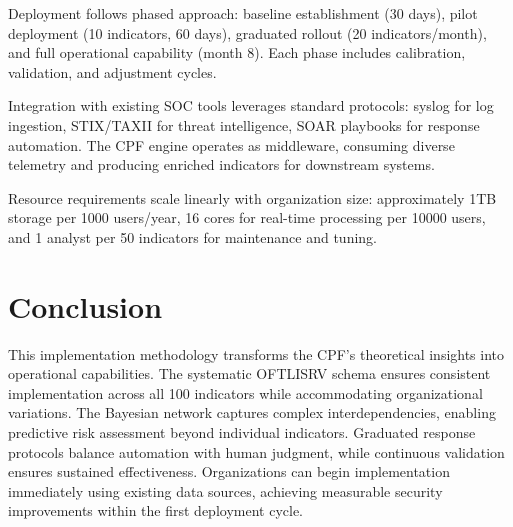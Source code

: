 \documentclass[10pt, twocolumn]{article}
\begin{document}
Deployment follows phased approach: baseline establishment (30 days), pilot deployment (10 indicators, 60 days), graduated rollout (20 indicators/month), and full operational capability (month 8). Each phase includes calibration, validation, and adjustment cycles.

Integration with existing SOC tools leverages standard protocols: syslog for log ingestion, STIX/TAXII for threat intelligence, SOAR playbooks for response automation. The CPF engine operates as middleware, consuming diverse telemetry and producing enriched indicators for downstream systems.

Resource requirements scale linearly with organization size: approximately 1TB storage per 1000 users/year, 16 cores for real-time processing per 10000 users, and 1 analyst per 50 indicators for maintenance and tuning.

\section{Conclusion}

This implementation methodology transforms the CPF's theoretical insights into operational capabilities. The systematic OFTLISRV schema ensures consistent implementation across all 100 indicators while accommodating organizational variations. The Bayesian network captures complex interdependencies, enabling predictive risk assessment beyond individual indicators. Graduated response protocols balance automation with human judgment, while continuous validation ensures sustained effectiveness. Organizations can begin implementation immediately using existing data sources, achieving measurable security improvements within the first deployment cycle.
\end{document}
